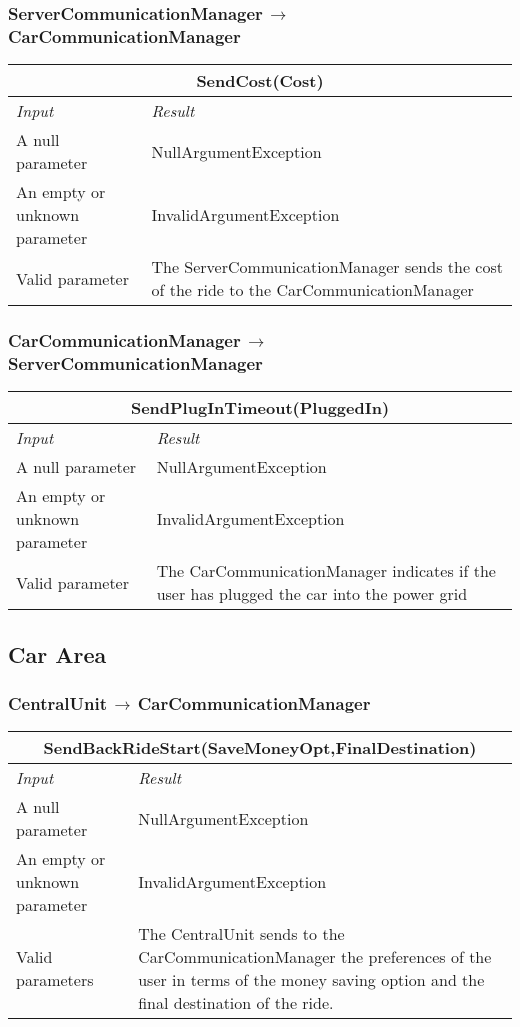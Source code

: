 \documentclass[11pt,a4paper]{report}
\begin{document}
\subsubsection{ServerCommunicationManager$\,\to\,$CarCommunicationManager}
\begin{tabularx}{\textwidth}{|X|X|}
	\hline
	\multicolumn{2}{|c|}{\textbf{SendCost(Cost)}}\\
	\hline
	\textit{Input} & \textit{Result}\\
	\hline
	A null parameter & NullArgumentException\\
	\hline
	An empty or unknown parameter & InvalidArgumentException\\
	\hline
	Valid parameter & The ServerCommunicationManager sends the cost of the ride to the CarCommunicationManager\\
	\hline
\end{tabularx}
\subsubsection{CarCommunicationManager$\,\to\,$ServerCommunicationManager}
\begin{tabularx}{\textwidth}{|X|X|}
	\hline
	\multicolumn{2}{|c|}{\textbf{SendPlugInTimeout(PluggedIn)}}\\
	\hline
	\textit{Input} & \textit{Result}\\
	\hline
	A null parameter & NullArgumentException\\
	\hline
	An empty or unknown parameter & InvalidArgumentException\\
	\hline
	Valid parameter & The CarCommunicationManager indicates if the user has plugged the car into the power grid\\
	\hline
\end{tabularx}
\subsection{Car Area}
\subsubsection{CentralUnit$\,\to\,$CarCommunicationManager}
\begin{tabularx}{\textwidth}{|X|X|}
	\hline
	\multicolumn{2}{|c|}{\textbf{SendBackRideStart(SaveMoneyOpt,FinalDestination)}}\\
	\hline
	\textit{Input} & \textit{Result}\\
	\hline
	A null parameter & NullArgumentException\\
	\hline
	An empty or unknown parameter & InvalidArgumentException\\
	\hline
	Valid parameters & The CentralUnit sends to the CarCommunicationManager the preferences of the user in terms of the money saving option and the final destination of the ride.\\
	\hline
\end{tabularx}
\end{document}
